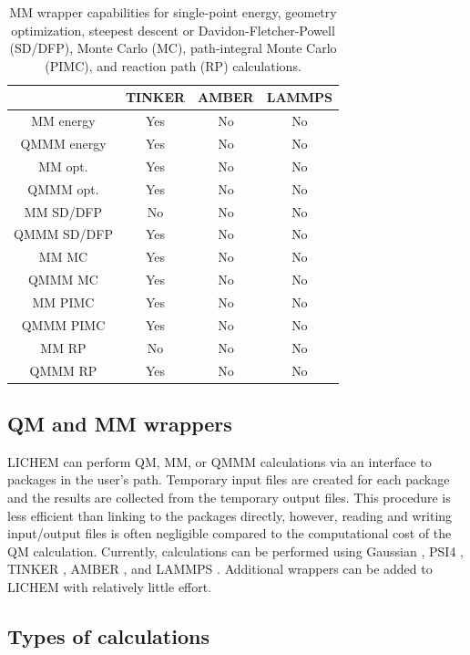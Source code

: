 \documentclass[12pt]{report}
\begin{document}
\begin{table}[hbt]
 \centering
 \begin{tabular}{|c|c c c|}
 \hline
  & TINKER & AMBER & LAMMPS \\ \hline
 MM energy &  Yes & No & No \\
 QMMM energy & Yes & No & No \\ \hline
 MM opt. & Yes & No & No \\
 QMMM opt. & Yes & No & No \\ \hline
 MM SD/DFP & No & No & No \\
 QMMM SD/DFP & Yes & No & No \\ \hline
 MM MC & Yes & No & No \\
 QMMM MC & Yes & No & No \\ \hline
 MM PIMC & Yes & No & No \\
 QMMM PIMC & Yes & No & No \\ \hline
 MM RP & No & No & No \\
 QMMM RP & Yes & No & No \\ \hline
 \end{tabular}
 \caption{
 MM wrapper capabilities for single-point energy, geometry optimization,
 steepest descent or Davidon-Fletcher-Powell (SD/DFP), Monte Carlo (MC),
 path-integral Monte Carlo (PIMC), and reaction path (RP) calculations.}
 \label{tab:MMWrapCap}
\end{table}

\subsection{QM and MM wrappers}

LICHEM can perform QM, MM, or QMMM calculations via an interface to packages
in the user's path.
Temporary input files are created for each package and the results are
collected from the temporary output files.
This procedure is less efficient than linking to the packages directly,
however, reading and writing input/output files is often negligible compared
to the computational cost of the QM calculation.
Currently, calculations can be performed using Gaussian \cite{Frisch2009},
PSI4 \cite{Turney2012}, TINKER \cite{Ponder2015}, AMBER \cite{Case2015}, and
LAMMPS \cite{Plimpton1995}.
Additional wrappers can be added to LICHEM with relatively little effort.

\subsection{Types of calculations}
\end{document}
